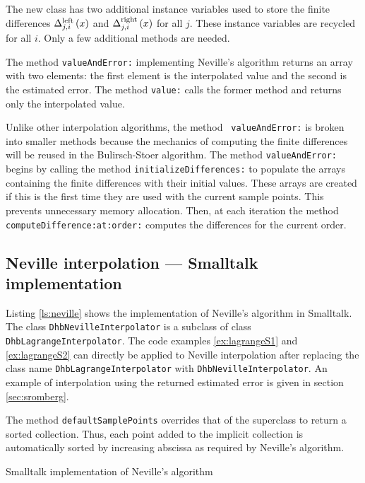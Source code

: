 \documentclass[twoside]{book}
\begin{document}
The new class has two additional instance variables used to store
the finite differences $\Delta_{j,i}^{\mathop{\rm
left}}\left(x\right)$ and $\Delta_{j,i}^{\mathop{\rm
right}}\left(x\right)$ for all $j$. These instance variables are
recycled for all $i$. Only a few additional methods are needed.

The method {\tt valueAndError:} implementing Neville's algorithm
returns an array with two elements: the first element is the
interpolated value and the second is the estimated error. The
method {\tt value:} calls the former method and returns only the
interpolated value.

Unlike other interpolation algorithms, the method {\tt
valueAndError:} is broken into smaller methods because the
mechanics of computing the finite differences will be reused in
the Bulirsch-Stoer algorithm. The method {\tt valueAndError:}
begins by calling the method {\tt initializeDifferences:} to
populate the arrays containing the finite differences with their
initial values. These arrays are created if this is the first time
they are used with the current sample points. This prevents
unnecessary memory allocation. Then, at each iteration the method
{\tt computeDifference:at:order:} computes the differences for the
current order.

\subsection{ Neville interpolation --- Smalltalk  implementation}
Listing \ref{ls:neville} shows the implementation of Neville's
algorithm in Smalltalk. The class {\tt DhbNevilleInterpolator} is
a subclass of class {\tt DhbLagrangeInterpolator}. The code
examples \ref{ex:lagrangeS1} and \ref{ex:lagrangeS2} can directly
be applied to Neville interpolation after replacing the class name
{\tt DhbLagrangeInterpolator} with {\tt DhbNevilleInterpolator}.
An example of interpolation using the returned estimated error is
given in section \ref{sec:sromberg}.

The method {\tt defaultSamplePoints} overrides that of the
superclass to return a sorted collection. Thus, each point added
to the implicit collection is automatically sorted by increasing
abscissa as required by Neville's algorithm.
\begin{listing}
  Smalltalk implementation of Neville's algorithm
\label{ls:neville}

\end{listing}
\end{document}
